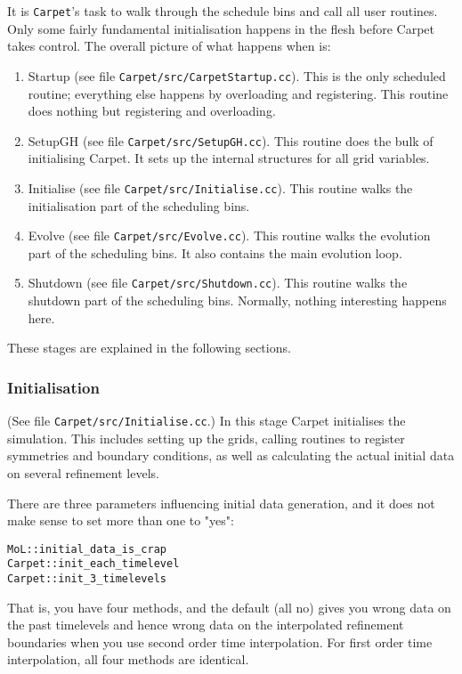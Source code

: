 \documentclass{article}
\begin{document}
   It is \texttt{Carpet}'s task to walk through the schedule bins and
   call all user routines.  Only some fairly fundamental
   initialisation happens in the flesh before Carpet takes control.
   The overall picture of what happens when is:
\begin{enumerate}
\item
   Startup (see file \texttt{Carpet/src/CarpetStartup.cc}).  This is
   the only scheduled routine; everything else happens by overloading
   and registering.  This routine does nothing but registering and
   overloading.
\item
   SetupGH (see file \texttt{Carpet/src/SetupGH.cc}).  This routine
   does the bulk of initialising Carpet.  It sets up the internal
   structures for all grid variables.
\item
   Initialise (see file \texttt{Carpet/src/Initialise.cc}).  This
   routine walks the initialisation part of the scheduling bins.
\item
   Evolve (see file \texttt{Carpet/src/Evolve.cc}).  This routine
   walks the evolution part of the scheduling bins.  It also contains
   the main evolution loop.
\item
   Shutdown (see file \texttt{Carpet/src/Shutdown.cc}).  This routine
   walks the shutdown part of the scheduling bins.  Normally, nothing
   interesting happens here.
\end{enumerate}
   These stages are explained in the following sections.



\subsubsection{Initialisation}



   (See file \texttt{Carpet/src/Initialise.cc}.)  In this stage Carpet
   initialises the simulation.  This includes setting up the grids,
   calling routines to register symmetries and boundary conditions, as
   well as calculating the actual initial data on several refinement
   levels.

There are three parameters influencing initial data generation, and
it does not make sense to set more than one to "yes":

\begin{verbatim}
MoL::initial_data_is_crap
Carpet::init_each_timelevel
Carpet::init_3_timelevels
\end{verbatim}

That is, you have four methods, and the default (all no) gives you
wrong data on the past timelevels and hence wrong data on the
interpolated refinement boundaries when you use second order time
interpolation.  For first order time interpolation, all four methods
are identical.
\end{document}
